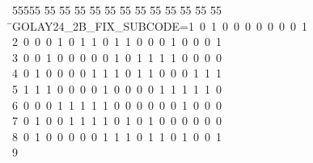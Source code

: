 %
%
\begin{tabbing}
55555 \= 55 \= 55 \= 55 \= 55 \= 55 \= 55 \= 55 \= 55 \= 55 \= 55 \= 55 \= 55 \= \>GOLAY24\_2B\_FIX\_SUBCODE=1\ 0\ 1\ 0\ 0\ 0\ 0\ 0\ 0\ 0\ 1\ \\[0pt]
2\ 0\ 0\ 0\ 1\ 0\ 1\ 1\ 0\ 1\ 1\ 0\ 0\ 0\ 1\ 0\ 0\ 0\ 1\ \\[0pt]
3\ 0\ 0\ 1\ 0\ 0\ 0\ 0\ 0\ 1\ 0\ 1\ 1\ 1\ 1\ 0\ 0\ 0\ 0\ \\[0pt]
4\ 0\ 1\ 0\ 0\ 0\ 0\ 1\ 1\ 1\ 0\ 1\ 1\ 0\ 0\ 0\ 1\ 1\ 1\ \\[0pt]
5\ 1\ 1\ 1\ 0\ 0\ 0\ 0\ 1\ 0\ 0\ 0\ 0\ 1\ 1\ 1\ 1\ 1\ 0\ \\[0pt]
6\ 0\ 0\ 0\ 1\ 1\ 1\ 1\ 1\ 0\ 0\ 0\ 0\ 0\ 0\ 1\ 0\ 0\ 0\ \\[0pt]
7\ 0\ 1\ 0\ 0\ 1\ 1\ 1\ 1\ 0\ 1\ 0\ 1\ 0\ 0\ 0\ 0\ 0\ 0\ \\[0pt]
8\ 0\ 1\ 0\ 0\ 0\ 0\ 0\ 1\ 1\ 1\ 0\ 1\ 1\ 0\ 1\ 0\ 0\ 1\\[0pt]
9\>\end{tabbing}
